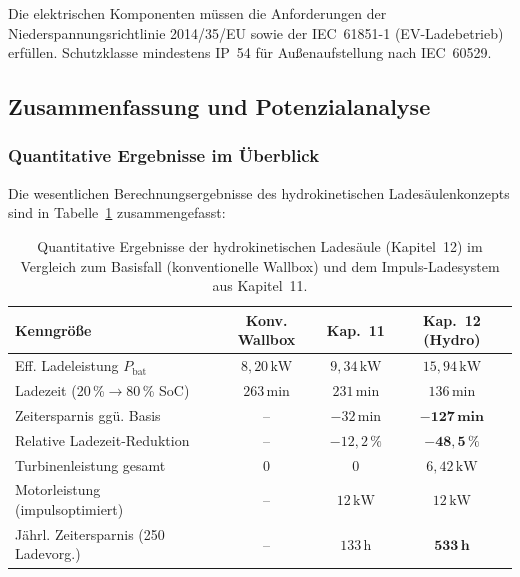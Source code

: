 ﻿\documentclass[a4paper,12pt]{article}
\begin{document}
Die elektrischen Komponenten müssen die Anforderungen der Niederspannungsrichtlinie
2014/35/EU sowie der IEC~61851-1 (EV-Ladebetrieb) erfüllen. Schutzklasse
mindestens IP~54 für Außenaufstellung nach IEC~60529.

\subsection{Zusammenfassung und Potenzialanalyse}

\subsubsection{Quantitative Ergebnisse im Überblick}

Die wesentlichen Berechnungsergebnisse des hydrokinetischen Ladesäulenkonzepts
sind in Tabelle~\ref{tab:kap12_zusammenfassung} zusammengefasst:

\begin{table}[htbp]
  \centering
  \caption{Quantitative Ergebnisse der hydrokinetischen Ladesäule (Kapitel~12)
           im Vergleich zum Basisfall (konventionelle Wallbox) und
           dem Impuls-Ladesystem aus Kapitel~11.}
  \label{tab:kap12_zusammenfassung}
  \begin{tabular}{lccc}
    \toprule
    \textbf{Kenngröße} & \textbf{Konv. Wallbox} & \textbf{Kap.~11} & \textbf{Kap.~12 (Hydro)} \\
    \midrule
    Eff. Ladeleistung $P_\text{bat}$     & $8{,}20\,\text{kW}$  & $9{,}34\,\text{kW}$  & $15{,}94\,\text{kW}$ \\
    Ladezeit (20\,\%$\to$80\,\% SoC)    & $263\,\text{min}$    & $231\,\text{min}$    & $136\,\text{min}$ \\
    Zeitersparnis ggü. Basis             & --                   & $-32\,\text{min}$    & $\mathbf{-127\,\text{min}}$ \\
    Relative Ladezeit-Reduktion          & --                   & $-12{,}2\,\%$        & $\mathbf{-48{,}5\,\%}$ \\
    Turbinenleistung gesamt              & $0$                  & $0$                  & $6{,}42\,\text{kW}$ \\
    Motorleistung (impulsoptimiert)      & --                   & $12\,\text{kW}$       & $12\,\text{kW}$ \\
    Jährl. Zeitersparnis (250 Ladevorg.) & --                   & $133\,\text{h}$      & $\mathbf{533\,\text{h}}$ \\
    \bottomrule
  \end{tabular}
\end{table}
\end{document}
